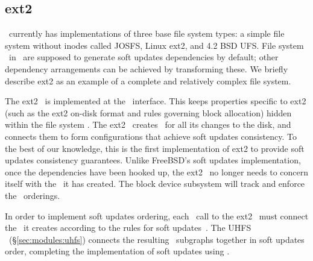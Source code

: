 \subsection{ext2}
\label{sec:using:ext2}

\Kudos\ currently has implementations of three base file system types: a simple
file system without inodes called JOSFS, Linux ext2, and 4.2 BSD UFS. File
system \modules\ in \Kudos\ are supposed to generate soft updates dependencies
by default; other dependency arrangements can be achieved by transforming these.
We briefly describe ext2 as an example of a complete and relatively complex file
system.

The ext2 \module\ is implemented at the \LFS\ interface. This keeps properties
specific to ext2 (such as the ext2 on-disk format and rules governing block
allocation) hidden within the file system \module. The ext2 \module\ creates
\chdescs\ for all its changes to the disk, and connects them to form
configurations that achieve soft updates consistency. To the best of our
knowledge, this is the first implementation of ext2 to provide soft updates
consistency guarantees. Unlike FreeBSD's soft updates implementation, once the
dependencies have been hooked up, the ext2 \module\ no longer needs to concern
itself with the \chdescs\ it has created. The block device subsystem will track
and enforce the \chdesc\ orderings.

In order to implement soft updates ordering, each \LFS\ call to the ext2
\module\ must connect the \chdescs\ it creates according to the rules for soft
updates~\cite{ganger00soft}. The UHFS \module\ (\S\ref{sec:modules:uhfs})
connects the resulting \chdesc\ subgraphs together in soft updates order,
completing the implementation of soft updates using \chdescs.
